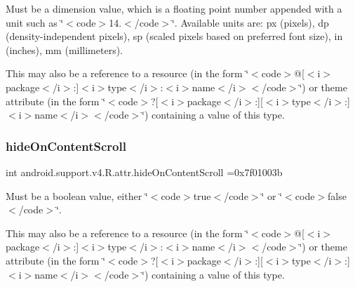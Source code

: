 Must be a dimension value, which is a floating point number appended with a unit such as \char`\"{}$<$code$>$14.\+5sp$<$/code$>$\char`\"{}. Available units are\+: px (pixels), dp (density-\/independent pixels), sp (scaled pixels based on preferred font size), in (inches), mm (millimeters). 

This may also be a reference to a resource (in the form \char`\"{}$<$code$>$@\mbox{[}$<$i$>$package$<$/i$>$\+:\mbox{]}$<$i$>$type$<$/i$>$\+:$<$i$>$name$<$/i$>$$<$/code$>$\char`\"{}) or theme attribute (in the form \char`\"{}$<$code$>$?\mbox{[}$<$i$>$package$<$/i$>$\+:\mbox{]}\mbox{[}$<$i$>$type$<$/i$>$\+:\mbox{]}$<$i$>$name$<$/i$>$$<$/code$>$\char`\"{}) containing a value of this type. \mbox{\label{classandroid_1_1support_1_1v4_1_1R_1_1attr_aa4d568c6c84659b535243051a2556f57}} 
\subsubsection{\texorpdfstring{hide\+On\+Content\+Scroll}{hideOnContentScroll}}
{\footnotesize\ttfamily int android.\+support.\+v4.\+R.\+attr.\+hide\+On\+Content\+Scroll =0x7f01003b\hspace{0.3cm}{\ttfamily [static]}}

Must be a boolean value, either \char`\"{}$<$code$>$true$<$/code$>$\char`\"{} or \char`\"{}$<$code$>$false$<$/code$>$\char`\"{}. 

This may also be a reference to a resource (in the form \char`\"{}$<$code$>$@\mbox{[}$<$i$>$package$<$/i$>$\+:\mbox{]}$<$i$>$type$<$/i$>$\+:$<$i$>$name$<$/i$>$$<$/code$>$\char`\"{}) or theme attribute (in the form \char`\"{}$<$code$>$?\mbox{[}$<$i$>$package$<$/i$>$\+:\mbox{]}\mbox{[}$<$i$>$type$<$/i$>$\+:\mbox{]}$<$i$>$name$<$/i$>$$<$/code$>$\char`\"{}) containing a value of this type. \mbox{\label{classandroid_1_1support_1_1v4_1_1R_1_1attr_af892acc4465801168a6992e839fecefc}} 
